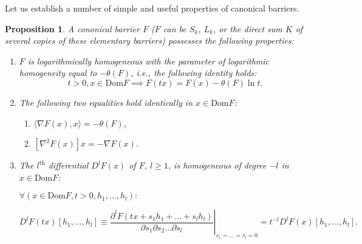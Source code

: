 \documentclass[11pt,a4paper]{article}
\newtheorem{prop}[thm]{Proposition}
\begin{document}
Let us establish a number of simple and useful properties of canonical barriers.

\begin{prop}
    A cononical barrier $F$ ($F$ can be $S_k$, $L_k$, or the direct sum $K$ of several copies of these elementary barriers) possesses the following properties:
    \begin{enumerate}
        \item[(i)] $F$ is logarithmically homogeneous with the parameter of logarithmic homogeneity equal to $-\theta(F)$, i.e., the following identity holds:
        \begin{equation*}
            t>0, x \in \text{Dom}F \implies F(tx) = F(x)-\theta(F)\ln t.
        \end{equation*}
        
        \item[(ii)] The following two equalities hold identically in $x \in \text{Dom}F$:
        \begin{enumerate}
            \item[(a)] $\langle\nabla F(x), x\rangle = -\theta(F)$,
            \item[(b)] $[\nabla ^2F(x)]x = -\nabla F(x)$.
        \end{enumerate}
        
        \item[(iii)] The $l^\text{th}$ differential $D^l F(x)$ of $F$, $l\geq 1$, is homogeneous of degree $-l$ in $x \in \text{Dom}F$:

    $\forall(x \in \text{Dom}F, t>0, h_1, \dots, h_l):$
    
    \begin{equation}
        D^l F(tx)[h_1, \dots, h_l] \equiv \left.\frac{\partial^l F(tx+s_1h_1+\dots+s_lh_l)}{\partial s_1\partial s_2 \dots \partial s_l}\right|_{s_1=\dots=s_l=0} = t^{-l}D^lF(x)[h_1,\dots,h_l].
    \end{equation}
    \end{enumerate}
\end{prop}
\end{document}
